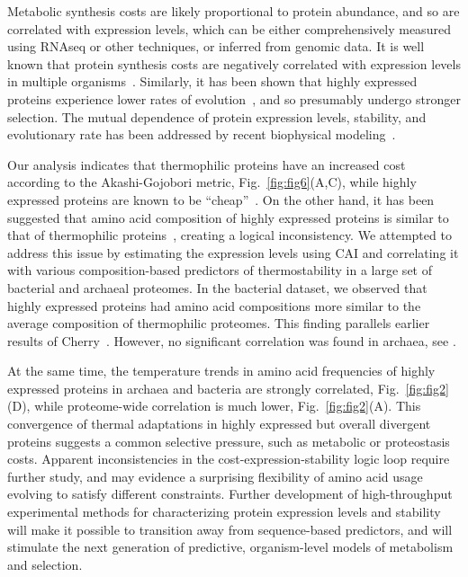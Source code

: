\documentclass[10pt,letterpaper]{article}
\begin{document}
Metabolic synthesis costs are likely proportional to protein abundance, and so are correlated with expression levels, which can be either comprehensively measured using RNAseq or other techniques, or inferred from genomic data. It is well known that protein synthesis costs are negatively correlated with expression levels in multiple organisms~\cite{Akashi2002Metabolic,Seligmann2003CostMinimization,Heizer2006Amino,Raiford2008Do}. Similarly, it has been shown that highly expressed proteins experience lower rates of evolution~\cite{Pal2001Highly,Rocha2004An,Drummond2005Why}, and so presumably undergo stronger selection. The mutual dependence of protein expression levels, stability, and evolutionary rate has been addressed by recent biophysical modeling~\cite{Serohijos2012Protein}.

Our analysis indicates that thermophilic proteins have an increased cost according to the Akashi-Gojobori metric, Fig.~\ref{fig:fig6}(A,C), while highly expressed proteins are known to be ``cheap''~\cite{Akashi2002Metabolic}. On the other hand, it has been suggested that amino acid composition of highly expressed proteins is similar to that of thermophilic proteins~\cite{Cherry2010Highly}, creating a logical inconsistency. We attempted to address this issue by estimating the expression levels using CAI and correlating it with various composition-based predictors of thermostability in a large set of bacterial and archaeal proteomes. In the bacterial dataset, we observed that highly expressed proteins had amino acid compositions more similar to the average composition of thermophilic proteomes. This finding parallels earlier results of Cherry~\cite{Cherry2010Highly}. However, no significant correlation was found in archaea, see . 

At the same time, the temperature trends in amino acid frequencies of highly expressed proteins in archaea and bacteria are strongly correlated, Fig.~\ref{fig:fig2}(D), while proteome-wide correlation is much lower, Fig.~\ref{fig:fig2}(A). This convergence of thermal adaptations in highly expressed but overall divergent proteins suggests a common selective pressure, such as metabolic or proteostasis costs. Apparent inconsistencies in the cost-expression-stability logic loop require further study, and may evidence a surprising flexibility of amino acid usage evolving to satisfy different constraints. Further development of high-throughput experimental methods for characterizing protein expression levels and stability will make it possible to transition away from sequence-based predictors, and will stimulate the next generation of predictive, organism-level models of metabolism and selection.
\end{document}
